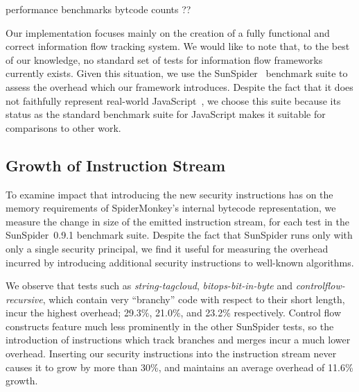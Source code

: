 \todo[inline] performance benchmarks
\todo[inline] bytcode counts ??


Our implementation focuses mainly on the creation of a fully functional and correct information flow tracking system.
We would like to note that, to the best of our knowledge, no standard set of tests for information flow frameworks currently exists.
Given this situation, we use the SunSpider~\cite{sunspider} benchmark suite to assess the overhead which our framework introduces.
Despite the fact that it does not faithfully represent real-world JavaScript~\cite{jsmeter}, we choose this suite because its status as the standard benchmark suite for JavaScript makes it suitable for comparisons to other work.

\subsection{Growth of Instruction Stream}


To examine impact that introducing the new security instructions has on the memory requirements of SpiderMonkey's internal bytecode representation, we measure the change in size of the emitted instruction stream, for each test in the SunSpider~0.9.1 benchmark suite.
Despite the fact that SunSpider runs only with only a single security principal, we find it useful for measuring the overhead incurred by introducing additional security instructions to well-known algorithms.

We observe that tests such as \textit{string-tagcloud}, \textit{bitops-bit-in-byte} and \textit{controlflow-recursive}, which contain very ``branchy'' code with respect to their short length, incur the highest overhead; 29.3\%, 21.0\%, and 23.2\% respectively.
Control flow constructs feature much less prominently in the other SunSpider tests, so the introduction of instructions which track branches and merges incur a much lower overhead.
Inserting our security instructions into the instruction stream never causes it to grow by more than 30\%, and maintains an average overhead of 11.6\% growth.

